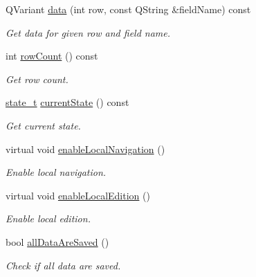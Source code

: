 \begin{DoxyCompactItemize}
QVariant \hyperlink{classmdt_abstract_sql_widget_a3d362ebfc2d4f4b40b48ca08db287b3c}{data} (int row, const QString \&fieldName) const 
\begin{DoxyCompactList}\small\item\em Get data for given row and field name. \end{DoxyCompactList}\item 
int \hyperlink{classmdt_abstract_sql_widget_a5e25e4a2e0dc56c06c530c9b543366f2}{rowCount} () const 
\begin{DoxyCompactList}\small\item\em Get row count. \end{DoxyCompactList}\item 
\hypertarget{classmdt_abstract_sql_widget_a786eb7b7b111eef748002419984be7d9}{
\hyperlink{classmdt_abstract_sql_widget_a54e6a7f2b41fb3edfa1e4ed62abf4072}{state\_\-t} \hyperlink{classmdt_abstract_sql_widget_a786eb7b7b111eef748002419984be7d9}{currentState} () const }
\label{classmdt_abstract_sql_widget_a786eb7b7b111eef748002419984be7d9}

\begin{DoxyCompactList}\small\item\em Get current state. \end{DoxyCompactList}\item 
virtual void \hyperlink{classmdt_abstract_sql_widget_a586e89097e9b4c27888695796ce945a0}{enableLocalNavigation} ()
\begin{DoxyCompactList}\small\item\em Enable local navigation. \end{DoxyCompactList}\item 
virtual void \hyperlink{classmdt_abstract_sql_widget_a4ad94a530c77292d122d38eb041da6e9}{enableLocalEdition} ()
\begin{DoxyCompactList}\small\item\em Enable local edition. \end{DoxyCompactList}\item 
bool \hyperlink{classmdt_abstract_sql_widget_aa5824c5fc3b0a7e118dd9ebb19084d2c}{allDataAreSaved} ()
\begin{DoxyCompactList}\small\item\em Check if all data are saved. \end{DoxyCompactList}\end{DoxyCompactItemize}
